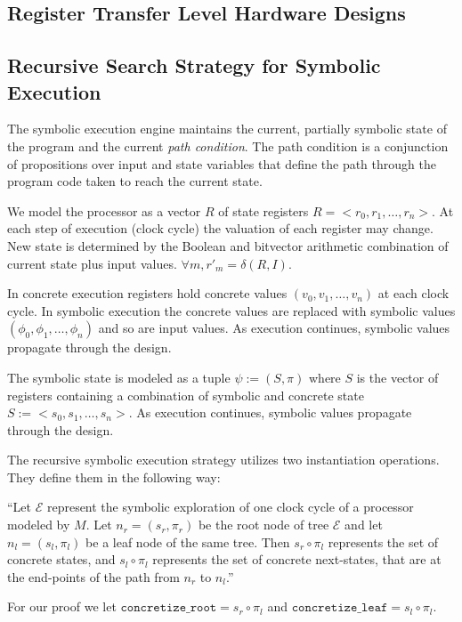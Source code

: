 \subsection{Register Transfer Level Hardware Designs}


\subsection{Recursive Search Strategy for Symbolic Execution}


The symbolic execution engine
maintains the current, partially symbolic state of the program and the current
\emph{path condition}. The path condition is a conjunction of propositions over
input and state variables that define the path through the program code taken to
reach the current state.


We model the processor as a vector $R$ of state registers $R = <r_0, r_1,
\ldots, r_n>$. At each step of execution (clock cycle) the valuation of each
register may change. New state is determined by the Boolean and bitvector
arithmetic combination of current state plus input values. $\forall m, r'_m =
\delta(R,I)$.

In concrete execution registers hold concrete values $(v_0, v_1, \ldots, v_n)$
at each clock cycle. In symbolic execution the concrete values are replaced with
symbolic values $(\phi_0, \phi_1, \ldots, \phi_n)$ and so are input values.
As execution continues, symbolic values propagate through the design.

The symbolic state is modeled as a tuple $\psi := (S,\pi)$ where $S$ is the
vector of registers containing a combination of symbolic and concrete state $S
:= <s_0, s_1, \ldots, s_n>$. As execution continues, symbolic values propagate
through the design.

The recursive symbolic execution strategy utilizes two instantiation operations. 
They define them in the following way: 

``Let $\mathcal{E}$ represent the symbolic exploration of one clock cycle of a processor modeled by $M$. Let $n_r = (s_r,\pi_r)$ be the root node of tree $\mathcal{E}$ and let $n_l = (s_l,\pi_l)$ be a leaf node of the same tree. 
Then $s_r \circ \pi_l$ represents the set of concrete states, and $s_l \circ \pi_l$ represents the set of concrete next-states, that are at the end-points of the path from $n_r$ to $n_l$.'' \cite{zhang2018recursive}

For our proof we let $\mathtt{concretize\_root}=  s_r \circ \pi_l$ and $\mathtt{concretize\_leaf} =  s_l \circ \pi_l$.





